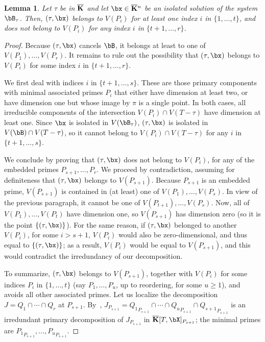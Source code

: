 \documentclass[12pt]{article}
\newtheorem{lemma}[definition]{Lemma}
\begin{document}
\begin{lemma}\label{lemma:vPi}
  Let $\tau$ be in $\overline{\mathbf{K}}$ and let $\bx \in \KKbar{}^n$ be an isolated
  solution of the system $\bB_\tau$. Then, $(\tau,\bx)$ belongs to $V(P_i)$
  for at least one index $i$ in $\{1,\dots,t\}$, and does not belong
  to $V(P_i)$ for any index $i$ in $\{t+1,\dots,r\}$.
\end{lemma}
\begin{proof}
  Because $(\tau,\bx)$ cancels $\bB$, it belongs at least to one of
  $V(P_1),\dots,V(P_r)$. It remains to rule out the possibility that
  $(\tau,\bx)$ belongs to $V(P_i)$ for some index $i$ in
  $\{t+1,\dots,r\}$.

  We first deal with indices $i$ in $\{t+1,\dots,s\}$. These are those
  primary components with minimal associated primes $P_i$ that either
  have dimension at least two, or have dimension one but whose image
  by $\pi$ is a single point. In both cases, all irreducible
  components of the intersection $V(P_i)\cap V(T-\tau)$ have dimension
  at least one. Since $\bx$ is isolated in $V(\bB_\tau)$, $(\tau,\bx)$ is
  isolated in $V(\bB)\cap V(T-\tau)$, so it cannot belong to
  $V(P_i)\cap V(T-\tau)$ for any $i$ in $\{t+1,\dots,s\}$.
  
  We conclude by proving that $(\tau,\bx)$ does not belong to $V(P_i)$,
  for any of the embedded primes $P_{s+1},\dots,P_r$. We proceed by
  contradiction, assuming for definiteness that $(\tau,\bx)$ belongs to
  $V(P_{s+1})$. Because $P_{s+1}$ is an embedded prime, $V(P_{s+1})$
  is contained in (at least) one of $V(P_1),\dots,V(P_s)$. In view of
  the previous paragraph, it cannot be one of
  $V(P_{t+1}),\dots,V(P_s)$.  Now, all of $V(P_1),\dots,V(P_t)$ have
  dimension one, so $V(P_{s+1})$ has dimension zero (so it is the point $\{(\tau,\bx)\}$). For the same
  reason, if $(\tau,\bx)$ belonged to another $V(P_i)$, for some $i >
  s+1$, $V(P_i)$ would also be zero-dimensional, and thus equal to $\{(\tau,\bx)\}$; as a result, $V(P_i)$
  would be equal to $V(P_{s+1})$, and this would contradict the
  irredundancy of our decomposition.
  
  To summarize, $(\tau,\bx)$ belongs to $V(P_{s+1})$, together with
  $V(P_i)$ for some indices $P_i$ in $\{1,\dots,t\}$ (say
  $P_1,\dots,P_u$, up to reordering, for some $u \ge 1$), and avoids
  all other associated primes.  Let us localize the decomposition
  $J=Q_1 \cap \cdots \cap Q_r$ at
  $P_{s+1}$. By~\cite[Proposition~4.9]{AtMc},
  $J_{P_{s+1}}={Q_1}_{P_{s+1}} \cap \cdots \cap {Q_u}_{P_{s+1}}\cap
  {Q_{s+1}}_{P_{s+1}}$ is an irredundant primary decomposition of
  $J_{P_{s+1}}$ in $\KKbar[T,\bX]_{P_{s+1}}$; the minimal primes are
  ${P_1}_{P_{s+1}},\dots,{P_u}_{P_{s+1}}$.


\end{proof}
\end{document}
